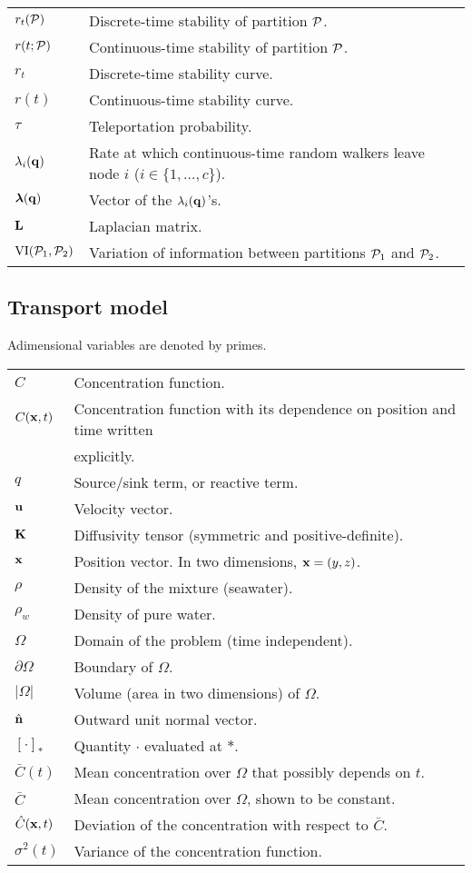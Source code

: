 \begin{table}[H]
\begin{tabular}{ll}
	$r_t(\P)$ & Discrete-time stability of partition $\P$.\\
	$r(t;\P)$ & Continuous-time stability of partition $\P$.\\
	$r_t$ & Discrete-time stability curve.\\
	$r(t)$ & Continuous-time stability curve.\\
	$\tau$ & Teleportation probability.\\
	$\lambda_i(\b q)$ & Rate at which continuous-time random walkers leave node $i$ ($i \in \{1,\dots,c\}$).\\
	$\bs \lambda(\b q)$ & Vector of the $\lambda_i(\b q)$'s.\\
	$\b L$ & Laplacian matrix.\\
	$\VI(\P_1,\P_2)$ & Variation of information between partitions $\P_1$ and $\P_2$.
\end{tabular}
\end{table}
\newpage
\subsection*{Transport model}
Adimensional variables are denoted by primes.
\begin{table}[H]
\begin{tabular}{ll}
	$C$ & Concentration function.\\
	$C(\b x,t)$ & Concentration function with its dependence on position and time written\\ & explicitly.\\
	$q$ & Source/sink term, or reactive term.\\
	$\b u$ & Velocity vector.\\
	$\b K$ & Diffusivity tensor (symmetric and positive-definite).\\
	$\b x$ & Position vector. In two dimensions, $\b x = (y,z)$.\\
	$\rho$ & Density of the mixture (seawater).\\
	$\rho_w$ & Density of pure water.\\
	$\Omega$ & Domain of the problem (time independent).\\
	$\partial \Omega$ & Boundary of $\Omega$.\\
	$|\Omega|$ & Volume (area in two dimensions) of $\Omega$.\\
	$\n$ & Outward unit normal vector.\\
	$[\cdot]_{*}$ & Quantity $\cdot$ evaluated at $*$.\\
	$\bar{C}(t)$ & Mean concentration over $\Omega$ that possibly depends on $t$.\\
	$\bar{C}$ & Mean concentration over $\Omega$, shown to be constant.\\
	$\hat{C}(\b x,t)$ & Deviation of the concentration with respect to $\bar{C}$.\\
	$\sigma^2(t)$ & Variance of the concentration function.\\
\end{tabular}
\end{table}


